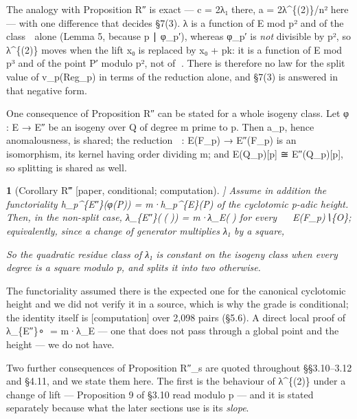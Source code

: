 \documentclass[11pt,a4paper]{article}
\theoremstyle{named}
\newtheorem*{namedthm}{}
\newcommand{\dispf}[1]{\par\smallskip{\centering #1\par}\smallskip}
\begin{document}
The analogy with Proposition R″ is exact — c = 2λ₁ there, a = 2λ\textasciicircum{}\{(2)\}/n² here — with one difference that decides §7(3). λ is a function of E mod p² and of the class  alone (Lemma 5, because p ∣ φ\_p′), whereas φ\_p′ is \textit{not} divisible by p², so λ\textasciicircum{}\{(2)\} moves when the lift x₀ is replaced by x₀ + pk: it is a function of E mod p³ and of the point P′ modulo p², not of . There is therefore no law for the split value of v\_p(Reg\_p) in terms of the reduction alone, and §7(3) is answered in that negative form.

One consequence of Proposition R″ can be stated for a whole isogeny class. Let φ : E → E″ be an isogeny over Q of degree m prime to p. Then a\_p, hence anomalousness, is shared; the reduction  : E(F\_p) → E″(F\_p) is an isomorphism, its kernel having order dividing m; and E(Q\_p)[p] ≅ E″(Q\_p)[p], so splitting is shared as well.

\begin{namedthm}[Corollary R‴ [paper, conditional; computation]]
Assume in addition the functoriality h\_p\textasciicircum{}\{E″\}(φ(P)) = m·h\_p\textasciicircum{}\{E\}(P) of the cyclotomic p-adic height. Then, in the non-split case, λ\_\{E″\}(()) = m·λ\_E() for every  ∈ E(F\_p)∖\{O\}; equivalently, since a change of generator multiplies λ₁ by a square,
\dispf{(λ₁(E)/p)·(λ₁(E″)/p) = (m/p)   in \{±1\}.}
So the quadratic residue class of λ₁ is constant on the isogeny class when every degree is a square modulo p, and splits it into two otherwise.
\end{namedthm}

The functoriality assumed there is the expected one for the canonical cyclotomic height and we did not verify it in a source, which is why the grade is conditional; the identity itself is [computation] over 2,098 pairs (§5.6). A direct local proof of λ\_\{E″\}∘ = m·λ\_E — one that does not pass through a global point and the height — we do not have.

Two further consequences of Proposition R″\_s are quoted throughout §§3.10–3.12 and §4.11, and we state them here. The first is the behaviour of λ\textasciicircum{}\{(2)\} under a change of lift — Proposition 9 of §3.10 read modulo p — and it is stated separately because what the later sections use is its \textit{slope}.
\end{document}
